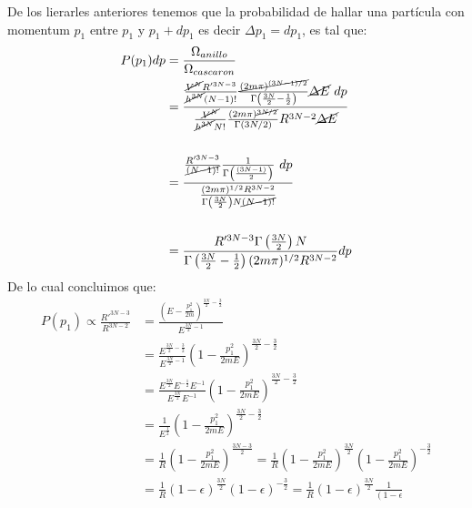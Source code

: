 \begin{answer}
    De los lierarles anteriores tenemos que la probabilidad de hallar una partícula con momentum $p_1$ entre $p_1$ y $p_1+dp_1$ es decir $\Delta p_1= dp_1$, es tal que:
    \begin{align*}
        P(p_1)dp &= \frac{\Omega_{anillo}}{\Omega_{cascaron}} \\
        &= \frac{
            \frac{\cancel{V^N}R'^{3N-3}}{\cancel{h^{3N}}(N-1)!}  \frac{ \cancel{(2m\pi)^{(3N-1)/2}}}{\Gamma\left(\frac{3N}2-\frac{1}2\right)}\cancel{\Delta E} ~dp
        }{
            \frac{\cancel{V^N}}{\cancel{h^{3N}}N!} \frac{(2m\pi)^{\cancel{3N/2}}}{\Gamma(3N/2)} R^{3N-2}  \cancel{\Delta E}
        }\\\\
        &=  \frac{
            \frac{R'^{3N-3}}{\cancel{(N-1)!}}  \frac{1}{\Gamma\left(\frac{(3N-1)}2\right)} ~dp
        }{
            \frac{(2m\pi)^{1/2}R^{3N-2}}{\Gamma\left(\frac{3N}2\right)N\cancel{(N-1)!}} 
        }\\\\
        &= \frac{R'^{3N-3}\Gamma\left(\frac{3N}2\right)N}{\Gamma\left(\frac{3N}2-\frac{1}2\right)(2m\pi)^{1/2}R^{3N-2} }dp
    \end{align*}
    De lo cual concluimos que:
    \begin{align*}
        P(p_1)  \propto \frac{R'^{3N-3}}{R^{3N-2}} &= \frac{\left(E-\frac{p_1^2}{2m}\right)^{\frac {3N}2 - \frac 32}}{{E}^{\frac{3N}{2} - 1}}\\
        &= \frac{E^{\frac {3N}2 -\frac 32}}{E^{\frac {3N}2 -1}}\left(1-\frac{p_1^2}{2mE}\right)^{\frac {3N}2 - \frac 32}\\
        &= \frac{E^{\frac {3N}2} E^{-\frac 12} E^{-1}}{E^{\frac {3N}2} E^{-1}}\left(1-\frac{p_1^2}{2mE}\right)^{\frac {3N}2 - \frac 32}\\
        &= \frac{1}{E^{\frac 12}}\left(
            1-\frac{p_1^2}{2mE}
        \right)^{\frac {3N}2 - \frac 32}\\
        &= \frac{1}{R}\left(
            1-\frac{p_1^2}{2mE}
        \right)^{\frac {3N - 3}2} = \frac{1}{R}\left(
            1-\frac{p_1^2}{2mE}
            \right)^{\frac {3N}2 } \left(
            1-\frac{p_1^2}{2mE}
        \right)^{-\frac 32}\\
        &= \frac{1}{R}\left(
            1-\epsilon
            \right)^{\frac {3N}2 } \left(
            1-\epsilon
        \right)^{-\frac 32} = \frac{1}{R}\left(
            1-\epsilon
            \right)^{\frac {3N}2} \frac{1}{\left(
            1-\epsilon
}
\end{align*}
\end{answer}
